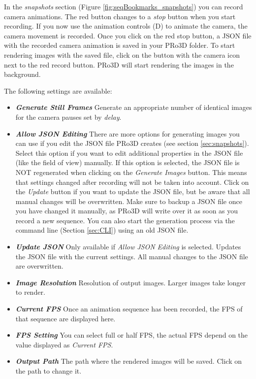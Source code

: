 In the \emph{snapshots} section (Figure \ref{fig:seqBookmarks_snapshots}) you can record camera animations. The red button changes to a \emph{stop} button when you start recording. If you now use the animation controls (D) to animate the camera, the camera movement is recorded. Once you click on the red stop button, a JSON file with the recorded camera animation is saved in your PRo3D folder. To start rendering images with the saved file, click on the button with the camera icon next to the red record button. PRo3D will start rendering the images in the background.

The following settings are available:
\begin{itemize}
	\item \textbf{\emph{Generate Still Frames}} Generate an appropriate number of identical images for the camera pauses set by \emph{delay}.
	\item \textbf{\emph{Allow JSON Editing}} There are more options for generating images you can use if you edit the JSON file PRo3D creates (see section \ref{sec:snapshots}). Select this option if you want to edit additional properties in the JSON file (like the field of view) manually. If this option is selected, the JSON file is NOT regenerated when clicking on the \emph{Generate Images} button. This means that settings changed after recording will not be taken into account. Click on the \emph{Update} button if you want to update the JSON file, but be aware that all manual changes will be overwritten. Make sure to backup a JSON file once you have changed it manually, as PRo3D will write over it as soon as you record a new sequence. You can also start the generation process via the command line (Section \ref{sec:CLI}) using an old JSON file. 
	\item \textbf{\emph{Update JSON}} Only available if \emph{Allow JSON Editing} is selected. Updates the JSON file with the current settings. All manual changes to the JSON file are overwritten. 
	\item \textbf{\emph{Image Resolution}} Resolution of output images. Larger images take longer to render.
	\item \textbf{\emph{Current FPS}} Once an animation sequence has been recorded, the FPS of that sequence are displayed here.
	\item \textbf{\emph{FPS Setting}} You can select full or half FPS, the actual FPS depend on the value displayed as \emph{Current FPS}. 
	\item \textbf{\emph{Output Path}} The path where the rendered images will be saved. Click on the path to change it.
\end{itemize}

